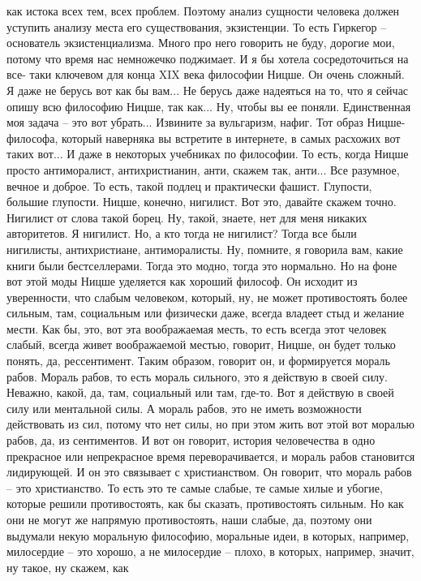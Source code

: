 как истока всех тем, всех проблем. Поэтому анализ сущности человека должен
уступить анализу места его существования, экзистенции. То есть Гиркегор –
основатель экзистенциализма. Много про него говорить не буду, дорогие мои,
потому что время нас немножечко поджимает. И я бы хотела сосредоточиться на все-
таки ключевом для конца XIX века философии Ницше. Он очень сложный. Я даже не
берусь вот как бы вам... Не берусь даже надеяться на то, что я сейчас опишу всю
философию Ницше, так как... Ну, чтобы вы ее поняли. Единственная моя задача –
это вот убрать... Извините за вульгаризм, нафиг. Тот образ Ницше-философа,
который наверняка вы встретите в интернете, в самых расхожих вот таких вот... И
даже в некоторых учебниках по философии. То есть, когда Ницше просто
антиморалист, антихристианин, анти, скажем так, анти... Все разумное, вечное и
доброе. То есть, такой подлец и практически фашист. Глупости, большие глупости.
Ницше, конечно, нигилист. Вот это, давайте скажем точно. Нигилист от слова такой
борец. Ну, такой, знаете, нет для меня никаких авторитетов. Я нигилист. Но, а
кто тогда не нигилист? Тогда все были нигилисты, антихристиане, антиморалисты.
Ну, помните, я говорила вам, какие книги были бестселлерами. Тогда это модно,
тогда это нормально. Но на фоне вот этой моды Ницше уделяется как хороший
философ. Он исходит из уверенности, что слабым человеком, который, ну, не может
противостоять более сильным, там, социальным или физически даже, всегда владеет
стыд и желание мести. Как бы, это, вот эта воображаемая месть, то есть всегда
этот человек слабый, всегда живет воображаемой местью, говорит, Ницше, он будет
только понять, да, рессентимент. Таким образом, говорит он, и формируется мораль
рабов. Мораль рабов, то есть мораль сильного, это я действую в своей силу.
Неважно, какой, да, там, социальный или там, где-то. Вот я действую в своей силу
или ментальной силы. А мораль рабов, это не иметь возможности действовать из
сил, потому что нет силы, но при этом жить вот этой вот моралью рабов, да, из
сентиментов. И вот он говорит, история человечества в одно прекрасное или
непрекрасное время переворачивается, и мораль рабов становится лидирующей. И он
это связывает с христианством. Он говорит, что мораль рабов – это христианство.
То есть это те самые слабые, те самые хилые и убогие, которые решили
противостоять, как бы сказать, противостоять сильным. Но как они не могут же
напрямую противостоять, наши слабые, да, поэтому они выдумали некую моральную
философию, моральные идеи, в которых, например, милосердие – это хорошо, а не
милосердие – плохо, в которых, например, значит, ну такое, ну скажем, как
